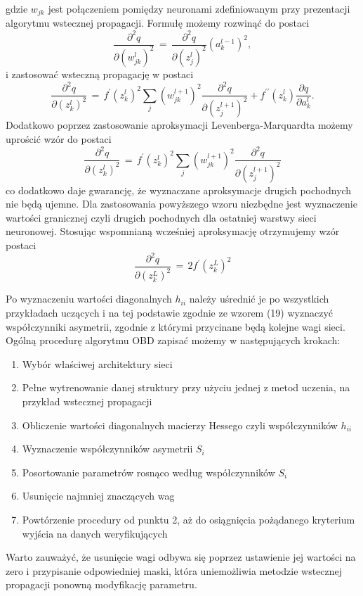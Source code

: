 gdzie \( w_{jk} \) jest połączeniem pomiędzy neuronami zdefiniowanym przy prezentacji algorytmu wstecznej propagacji.
Formułę możemy rozwinąć do postaci 
\begin{equation}
\frac{\partial^2 q}{\partial (w_{jk}^l)^2} \, = \, \frac{\partial^2 q}{\partial (z_j^{l})^2}(a_k^{l-1})^2 , 
\end{equation}
i zastosować wsteczną propagację w postaci
\begin{equation}
\frac{\partial^2q}{\partial (z_k^{l})^2} \, = \, f^{\prime}(z_k^l)^2 \sum_j (w_{jk}^{l+1})^2 \frac{\partial^2 q}{\partial (z_j^{l+1})^2} + f^{\prime \prime}(z_k^l) \frac{\partial q}{\partial a_k^l}. 
\end{equation}
Dodatkowo poprzez zastosowanie aproksymacji Levenberga-Marquardta możemy uprościć wzór do postaci
\begin{equation}
\frac{\partial^2q}{\partial (z_k^{l})^2} \, = \, f^{\prime}(z_k^l)^2 \sum_j (w_{jk}^{l+1})^2 \frac{\partial^2 q}{\partial (z_j^{l+1})^2}
\end{equation}
co dodatkowo daje gwarancję, że wyznaczane aproksymacje drugich pochodnych nie będą ujemne.
Dla zastosowania powyższego wzoru niezbędne jest wyznaczenie wartości granicznej czyli drugich pochodnych dla ostatniej warstwy sieci neuronowej. Stosując wspomnianą wcześniej aproksymację otrzymujemy wzór postaci
\begin{equation}
\frac{\partial^2q}{\partial (z_k^{L})^2} \, = \, 2f^{\prime}(z_k^{L})^2
\end{equation}
\par Po wyznaczeniu wartości diagonalnych \( h_{ii} \) należy uśrednić je po wszystkich przykładach uczących i na tej podstawie zgodnie ze wzorem (19) wyznaczyć współczynniki asymetrii, zgodnie z którymi przycinane będą kolejne wagi sieci. Ogólną procedurę algorytmu OBD zapisać możemy w następujących krokach: 
\begin{enumerate}
 \item Wybór właściwej architektury sieci
 \item Pełne wytrenowanie danej struktury przy użyciu jednej z metod uczenia, na przykład wstecznej propagacji
 \item Obliczenie wartości diagonalnych macierzy Hessego czyli współczynników \( h_{ii} \) 
 \item Wyznaczenie współczynników asymetrii \( S_i \)
 \item Posortowanie parametrów rosnąco według współczynników \( S_i \)
 \item Usunięcie najmniej znaczących wag
 \item Powtórzenie procedury od punktu 2, aż do osiągnięcia pożądanego kryterium wyjścia  na danych weryfikujących
\end{enumerate}
Warto zauważyć, że usunięcie wagi odbywa się poprzez ustawienie jej wartości na zero i przypisanie odpowiedniej maski, która uniemożliwia metodzie wstecznej propagacji ponowną modyfikację parametru.  

